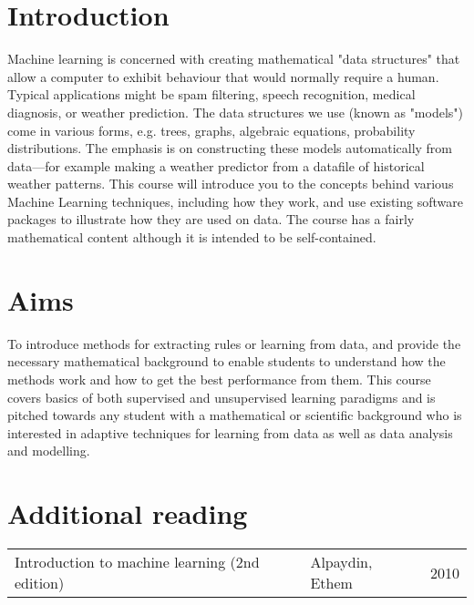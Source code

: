 \section*{Introduction}

Machine learning is concerned with creating mathematical "data structures" that
allow a computer to exhibit behaviour that would normally require a human.
Typical applications might be spam filtering, speech recognition, medical
diagnosis, or weather prediction. The data structures we use (known as "models")
come in various forms, e.g. trees, graphs, algebraic equations, probability
distributions. The emphasis is on constructing these models automatically from
data---for example making a weather predictor from a datafile of historical
weather patterns. This course will introduce you to the concepts behind various
Machine Learning techniques, including how they work, and use existing software
packages to illustrate how they are used on data. The course has a fairly
mathematical content although it is intended to be self-contained.

\section*{Aims}

To introduce methods for extracting rules or learning from data, and provide the
necessary mathematical background to enable students to understand how the
methods work and how to get the best performance from them. This course covers
basics of both supervised and unsupervised learning paradigms and is pitched
towards any student with a mathematical or scientific background who is
interested in adaptive techniques for learning from data as well as data
analysis and modelling.

\section*{Additional reading}

\begin{tabularx}{\textwidth}{X|X|l}
   Introduction to machine learning (2nd edition) & Alpaydin, Ethem & 2010\\
\end{tabularx}